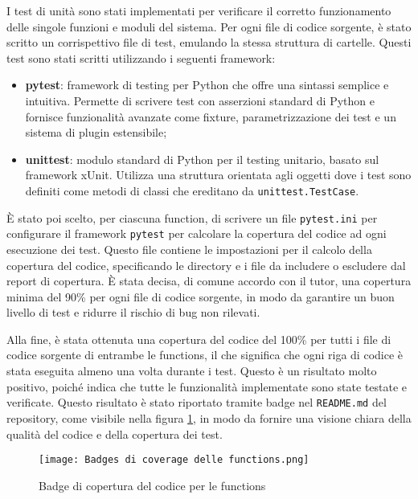 I test di unità sono stati implementati per verificare il corretto funzionamento delle singole funzioni e moduli del sistema. Per ogni file di codice sorgente, è stato scritto un corrispettivo file di test, emulando la stessa struttura di cartelle. Questi test sono stati scritti utilizzando i seguenti framework:
\begin{itemize}
    \item \textbf{\gls{pytest}}: framework di testing per Python che offre una sintassi semplice e intuitiva. Permette di scrivere test con asserzioni standard di Python e fornisce funzionalità avanzate come fixture, parametrizzazione dei test e un sistema di plugin estensibile;
    \item \textbf{\gls{unittest}}: modulo standard di Python per il testing unitario, basato sul framework xUnit. Utilizza una struttura orientata agli oggetti dove i test sono definiti come metodi di classi che ereditano da \texttt{unittest.TestCase}.
\end{itemize}

È stato poi scelto, per ciascuna function, di scrivere un file \texttt{pytest.ini} per configurare il framework \texttt{pytest} per calcolare la copertura del codice ad ogni esecuzione dei test. Questo file contiene le impostazioni per il calcolo della copertura del codice, specificando le directory e i file da includere o escludere dal report di copertura. È stata decisa, di comune accordo con il tutor, una copertura minima del 90\% per ogni file di codice sorgente, in modo da garantire un buon livello di test e ridurre il rischio di bug non rilevati.

Alla fine, è stata ottenuta una copertura del codice del 100\% per tutti i file di codice sorgente di entrambe le functions, il che significa che ogni riga di codice è stata eseguita almeno una volta durante i test. Questo è un risultato molto positivo, poiché indica che tutte le funzionalità implementate sono state testate e verificate.
Questo risultato è stato riportato tramite badge nel \texttt{README.md} del repository, come visibile nella figura \ref{fig:coverage-badges}, in modo da fornire una visione chiara della qualità del codice e della copertura dei test.

\begin{figure}
    \centering
    \texttt{[image: Badges di coverage delle functions.png]}
    \caption{Badge di copertura del codice per le functions}
    \label{fig:coverage-badges}
\end{figure}


